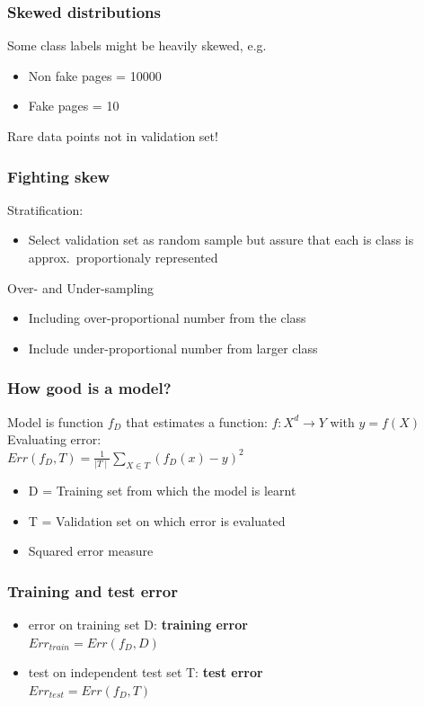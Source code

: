 \subsubsection{Skewed distributions}
Some class labels might be heavily skewed, e.g.\:
\begin{itemize}
\item Non fake pages = 10000
\item Fake pages = 10
\end{itemize}
Rare data points not in validation set!

\subsubsection{Fighting skew}
Stratification:
\begin{itemize}
\item Select validation set as random sample but assure that each is
  class is approx.\ proportionaly represented
\end{itemize}
Over- and Under-sampling
\begin{itemize}
\item Including over-proportional number from the class
\item Include under-proportional number from larger class
\end{itemize}

\subsubsection{How good is a model?}
Model is function $ f_D $ that estimates a function: $ f: X^d
\rightarrow Y$ with $ y = f(X) $ \\
Evaluating error: \\
$ Err(f_D, T) = \frac{1}{\mid T \mid} \sum_{X \in T} (f_D(x) - y)^2 $
\begin{itemize}
\item D = Training set from which the model is learnt
\item T = Validation set on which error is evaluated
\item Squared error measure
\end{itemize}

\subsubsection{Training and test error}
\begin{itemize}
\item error on training set D: \textbf{training error} \\
  $ Err_{train} = Err(f_D, D) $
\item test on independent test set T: \textbf{test error} \\
  $ Err_{test} = Err(f_D, T) $
\end{itemize}

